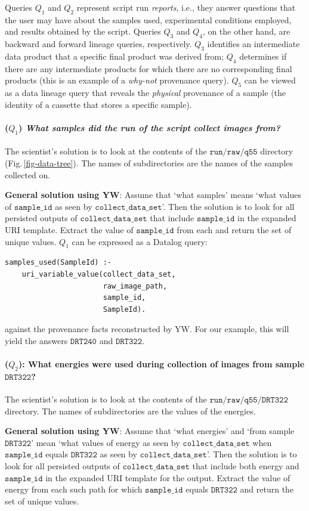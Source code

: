 \documentclass[letterpaper,twocolumn,10pt]{article}
\newcommand{\figref}[1]{Fig.\,\ref{#1}}
\newcommand{\code}[1]{\ensuremath{\mathtt{#1}}}
\newcommand{\yw}{\textsf{YW}}
\begin{document}
Queries $Q_1$ and $Q_2$ represent script run \emph{reports}, i.e.,
they answer questions that the user may have about the samples used,
experimental conditions employed, and results obtained by the script.
Queries $Q_3$ and $Q_4$, on the other hand, are backward and forward
lineage queries, respectively. $Q_3$ identifies an intermediate data
product that a specific final product was derived from; $Q_4$
determines if there are any intermediate products for which there are
no corresponding final products (this is an example of a
\emph{why-not} provenance query). $Q_5$ can be viewed as a data
lineage query that reveals the \emph{physical} provenance of a sample
(the identity of a cassette that stores a specific sample).

\paragraph{($Q_1$) \emph{What samples did the run of the script
  collect images from?}} 
The scientist's solution is to look at the contents of the
\code{run/raw/q55} directory (\figref{fig-data-tree}). The names of
subdirectories are the names of the samples collected on.

\textbf{General solution using \yw}: Assume that `what samples' means
`what values of \code{sample\_id} as seen by
\code{collect\_data\_set}'. Then the solution is to look for all
persisted outputs of \code{collect\_data\_set} that include
\code{sample\_id} in the expanded URI template.
Extract the value of \code{sample\_id} from each and return the set of
unique values. $Q_1$ can be expressed as a Datalog query:
\begin{verbatim}
samples_used(SampleId) :- 
    uri_variable_value(collect_data_set,
                       raw_image_path,
                       sample_id, 
                       SampleId).
\end{verbatim}
against the provenance facts reconstructed by \yw. For our example, this will yield the
answers \code{DRT240} and \code{DRT322}.


\paragraph{($Q_2$): What energies were used during collection of
  images from sample \code{DRT322}?}
The scientist's solution is to look at the contents of the
\code{run/raw/q55/DRT322} directory. The names of subdirectories are
the values of the energies.

\textbf{General solution using \yw}: Assume that `what energies' and
`from sample \code{DRT322}' mean `what values of energy as seen by
\code{collect\_data\_set} when \code{sample\_id} equals \code{DRT322}
as seen by \code{collect\_data\_set}'.  Then the solution is to look
for all persisted outputs of \code{collect\_data\_set} that include
both energy and \code{sample\_id} in the expanded URI template for the
output.  Extract the value of energy from each such path for which
\code{sample\_id} equals \code{DRT322} and return the set of unique
values.
\end{document}
